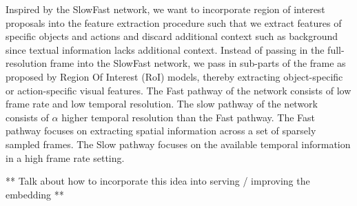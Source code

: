 Inspired by the SlowFast network, we want to incorporate region of interest proposals into the feature extraction procedure such that we extract features of specific objects and actions and discard additional context such as background since textual information lacks additional context. Instead of passing in the full-resolution frame into the SlowFast network, we pass in sub-parts of the frame as proposed by Region Of Interest (RoI) models, thereby extracting object-specific or action-specific visual features. The Fast pathway of the network consists of low frame rate and low temporal resolution. The slow pathway of the network consists of $\alpha$ higher temporal resolution than the Fast pathway. The Fast pathway focuses on extracting spatial information across a set of sparsely sampled frames. The Slow pathway focuses on the available temporal information in a high frame rate setting.

** Talk about how to incorporate this idea into serving / improving the embedding **



